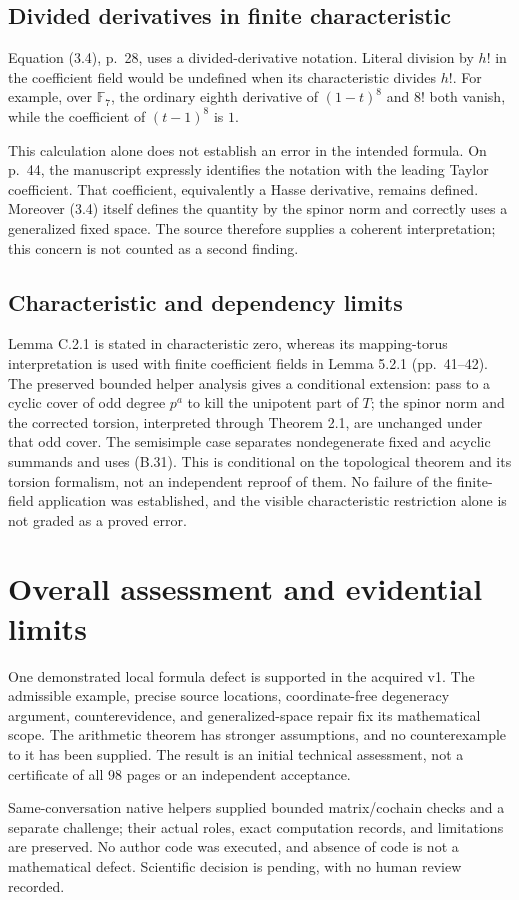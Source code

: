 \documentclass[10pt]{article}
\begin{document}
\subsection*{Divided derivatives in finite characteristic}
Equation (3.4), p. 28, uses a divided-derivative notation. Literal division by \(h!\) in the coefficient field would be undefined when its characteristic divides \(h!\). For example, over \(\mathbb F_7\), the ordinary eighth derivative of \((1-t)^8\) and \(8!\) both vanish, while the coefficient of \((t-1)^8\) is \(1\).\par
This calculation alone does not establish an error in the intended formula. On p. 44, the manuscript expressly identifies the notation with the leading Taylor coefficient. That coefficient, equivalently a Hasse derivative, remains defined. Moreover (3.4) itself defines the quantity by the spinor norm and correctly uses a generalized fixed space. The source therefore supplies a coherent interpretation; this concern is not counted as a second finding.\par
\subsection*{Characteristic and dependency limits}
Lemma C.2.1 is stated in characteristic zero, whereas its mapping-torus interpretation is used with finite coefficient fields in Lemma 5.2.1 (pp. 41–42). The preserved bounded helper analysis gives a conditional extension: pass to a cyclic cover of odd degree \(p^a\) to kill the unipotent part of \(T\); the spinor norm and the corrected torsion, interpreted through Theorem 2.1, are unchanged under that odd cover. The semisimple case separates nondegenerate fixed and acyclic summands and uses (B.31). This is conditional on the topological theorem and its torsion formalism, not an independent reproof of them. No failure of the finite-field application was established, and the visible characteristic restriction alone is not graded as a proved error.\par
\section*{Overall assessment and evidential limits}
One demonstrated local formula defect is supported in the acquired v1. The admissible example, precise source locations, coordinate-free degeneracy argument, counterevidence, and generalized-space repair fix its mathematical scope. The arithmetic theorem has stronger assumptions, and no counterexample to it has been supplied. The result is an initial technical assessment, not a certificate of all 98 pages or an independent acceptance.\par
Same-conversation native helpers supplied bounded matrix/cochain checks and a separate challenge; their actual roles, exact computation records, and limitations are preserved. No author code was executed, and absence of code is not a mathematical defect. Scientific decision is pending, with no human review recorded.\par
\end{document}
